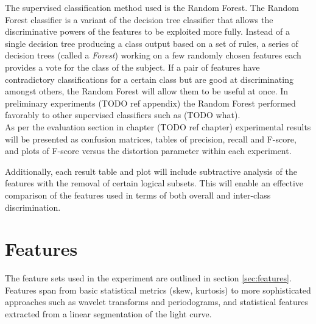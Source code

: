 
		The supervised classification method used is the Random Forest. The Random Forest classifier is a variant of the decision tree classifier that allows the discriminative powers of the features to be exploited more fully. Instead of a single decision tree producing a class output based on a set of rules, a series of decision trees (called a \emph{Forest}) working on a few randomly chosen features each provides a vote for the class of the subject. If a pair of features have contradictory classifications for a certain class but are good at discriminating amongst others, the Random Forest will allow them to be useful at once. In preliminary experiments (TODO ref appendix) the Random Forest performed favorably to other supervised classifiers such as (TODO what).\\ %

	As per the evaluation section in chapter (TODO ref chapter) experimental results will be presented as confusion matrices, tables of precision, recall and F-score, and plots of F-score versus the distortion parameter within each experiment.
	
	Additionally, each result table and plot will include subtractive analysis of the features with the removal of certain logical subsets. This will enable an effective comparison of the features used in terms of both overall and inter-class discrimination.
	
	\section{Features}
	\label{sec:baselinefeatures}
	The feature sets used in the experiment are outlined in section \ref{sec:features}. Features span from basic statistical metrics (skew, kurtosis) to more sophisticated approaches such as wavelet transforms and periodograms, and statistical features extracted from a linear segmentation of the light curve.
	
